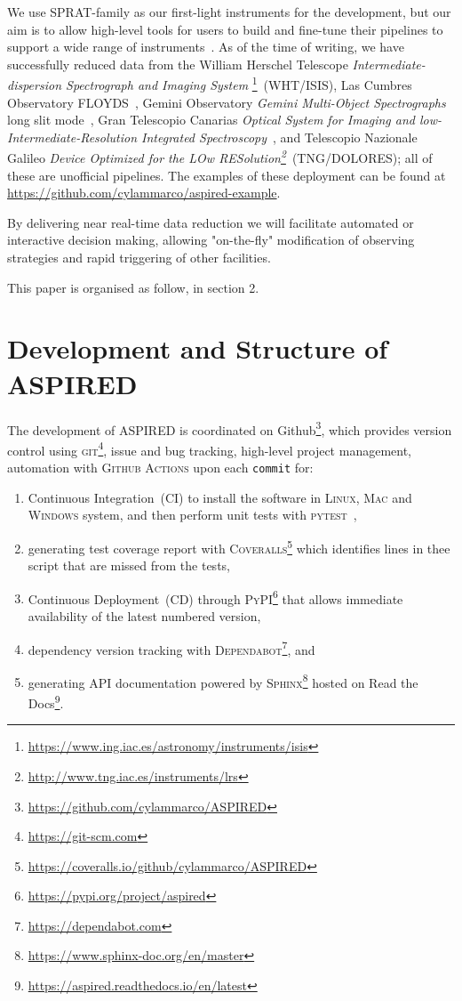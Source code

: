 \documentclass[fleqn,usenatbib]{mnras}
\begin{document}
We use SPRAT-family as our first-light instruments for the development, but our aim is to
allow high-level tools for users to build and fine-tune their pipelines to support
a wide range of instruments~\citep{2020arXiv201203505L, marco_2021_4463569}. As of the time of
writing, we have successfully reduced data from the William Herschel Telescope
\textit{Intermediate-dispersion Spectrograph and Imaging System}
\footnote{\url{https://www.ing.iac.es/astronomy/instruments/isis}}~(WHT/ISIS), Las Cumbres
Observatory FLOYDS~\citep[LCO/FLOYDS]{2013PASP..125.1031B}, Gemini Observatory
\textit{Gemini Multi-Object Spectrographs} long slit
mode~\citep[Gemini/GMOS-LS]{2004PASP..116..425H}, Gran Telescopio Canarias \textit{Optical
System for Imaging and low-Intermediate-Resolution Integrated
Spectroscopy}~\citep[GTC/OSIRIS]{2000SPIE.4008..623C}, and Telescopio Nazionale Galileo
\textit{Device Optimized for the LOw
RESolution\footnote{\url{http://www.tng.iac.es/instruments/lrs}}}~(TNG/DOLORES); all of
these are unofficial pipelines. The examples of these deployment can be found at
\url{https://github.com/cylammarco/aspired-example}.

By delivering near real-time data reduction we will facilitate automated or interactive
decision making, allowing "on-the-fly" modification of observing strategies and rapid
triggering of other facilities.

This paper is organised as follow, in section 2.

\section{Development and Structure of ASPIRED}
The development of ASPIRED is coordinated on Github\footnote{\url{https://github.com/cylammarco/ASPIRED}}, which provides version control using \textsc{git}\footnote{\url{https://git-scm.com}}, issue and bug tracking, high-level project management, automation with \textsc{Github Actions} upon each \texttt{commit} for:

\begin{enumerate}
    \item Continuous Integration~(CI) to install the software in \textsc{Linux}, \textsc{Mac} and \textsc{Windows} system, and then perform unit tests with \textsc{pytest}~\citep{pytest6.2},
    \item generating test coverage report with \textsc{Coveralls}\footnote{\url{https://coveralls.io/github/cylammarco/ASPIRED}} which identifies lines in thee script that are missed from the tests,
    \item Continuous Deployment~(CD) through \textsc{PyPI}\footnote{\url{https://pypi.org/project/aspired}} that allows immediate availability of the latest numbered version,
    \item dependency version tracking with \textsc{Dependabot}\footnote{\url{https://dependabot.com}}, and
    \item generating API documentation powered by \textsc{Sphinx}\footnote{\url{https://www.sphinx-doc.org/en/master}} hosted on Read the Docs\footnote{\url{https://aspired.readthedocs.io/en/latest}}.
\end{enumerate}
\end{document}
